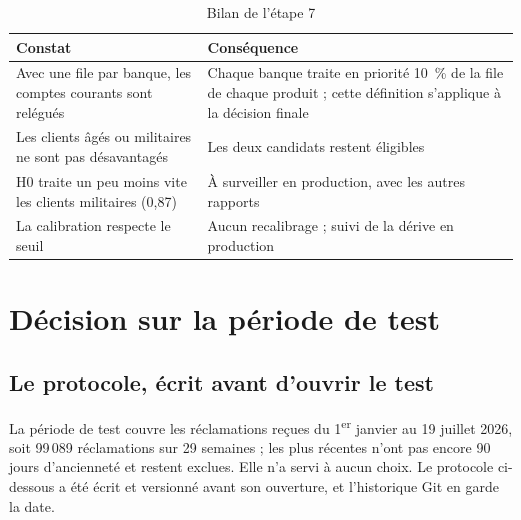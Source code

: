 \documentclass[11pt,a4paper]{article}
\begin{document}
\begin{table}[H]
\centering\small
\begin{tabularx}{\linewidth}{@{}Y Y@{}}
\toprule
Constat & Conséquence \\
\midrule
Avec une file par banque, les comptes courants sont relégués & Chaque banque traite en priorité 10~\% de la file de chaque produit ; cette définition s'applique à la décision finale \\
Les clients âgés ou militaires ne sont pas désavantagés & Les deux candidats restent éligibles \\
H0 traite un peu moins vite les clients militaires (0,87) & À surveiller en production, avec les autres rapports \\
La calibration respecte le seuil & Aucun recalibrage ; suivi de la dérive en production \\
\bottomrule
\end{tabularx}
\caption{Bilan de l'étape 7}
\end{table}

\section{Décision sur la période de test}
\label{sec:decision}

\subsection{Le protocole, écrit avant d'ouvrir le test}

La période de test couvre les réclamations reçues du 1\textsuperscript{er} janvier au 19 juillet 2026, soit 99\,089 réclamations sur 29 semaines ; les plus récentes n'ont pas encore 90 jours d'ancienneté et restent exclues. Elle n'a servi à aucun choix. Le protocole ci-dessous a été écrit et versionné avant son ouverture, et l'historique Git en garde la date.
\end{document}
